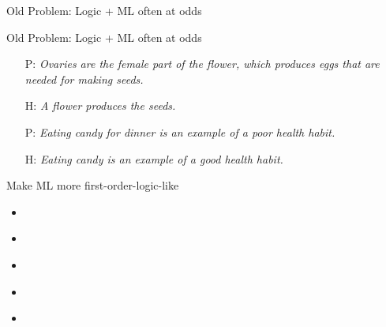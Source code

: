
\def\title{Old Problem: Logic + ML often at odds}
\begin{frame}{\title}
\begin{center}
\end{center}
\end{frame}


\begin{frame}[noframenumbering]{\title}
\begin{itemize}
\item[P:] \textit{Ovaries are the female part of the flower, which produces eggs that are needed for making seeds.}
\item[H:] \textit{A flower produces the seeds.}
\end{itemize}
\vspace{2ex}
\begin{itemize}
\item[P:] \textit{Eating candy for dinner is an example of a poor health habit.}
\item[H:] \textit{Eating candy is an example of a good health habit.}
\end{itemize}
\end{frame}


\begin{frame}[noframenumbering]{Make ML more first-order-logic-like}
\begin{itemize}
\item \cite{key:2006richardson-mln}
\item \cite{key:2011niu-tuffy}
\end{itemize}
\vspace{2ex}
\begin{itemize}
\item \cite{key:2012kimmig-psl}
\item \cite{key:2014beltagy-psl}
\end{itemize}
\vspace{2ex}
\begin{itemize}
\item \cite{key:2015rocktaschen-logic}
\end{itemize}
\end{frame}


